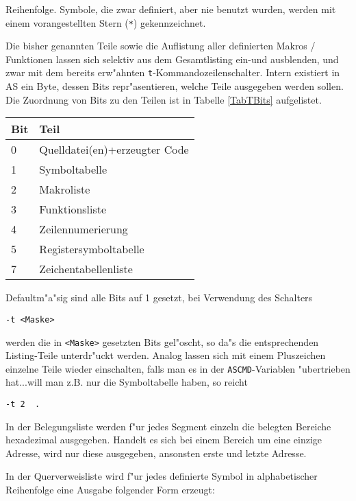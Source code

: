 \documentclass[12pt,a4paper,twoside]{report}
\newcommand{\tty}[1]{{\tt #1}}
\begin{document}
Reihenfolge.  Symbole, die zwar definiert, aber nie benutzt wurden,
werden mit einem vorangestellten Stern (\verb!*!) gekennzeichnet.
\par
Die bisher genannten Teile sowie die Auflistung aller definierten
Makros / Funktionen lassen sich selektiv aus dem Gesamtlisting ein-und
ausblenden, und zwar mit dem bereits erw"ahnten \tty{t}-Kommandozeilenschalter.
Intern existiert in AS ein Byte, dessen Bits repr"asentieren, welche Teile
ausgegeben werden sollen.  Die Zuordnung von Bits zu den Teilen ist in
Tabelle \ref{TabTBits} aufgelistet.
\par
\begin{table*}[p]
\begin{center}\begin{tabular}{|l|l|}
\hline
Bit & Teil \\
\hline
\hline
0   & Quelldatei(en)+erzeugter Code \\
1   & Symboltabelle \\
2   & Makroliste \\
3   & Funktionsliste \\
4   & Zeilennumerierung \\
5   & Registersymboltabelle \\
7   & Zeichentabellenliste \\
\hline
\end{tabular}\end{center}
\caption{Zuordnung der Bits zu den Listingkomponenten\label{TabTBits}}
\end{table*}
Defaultm"a"sig sind alle Bits auf 1 gesetzt, bei Verwendung des Schalters
\begin{verbatim}
-t <Maske>
\end{verbatim}
werden die in \verb!<Maske>! gesetzten Bits gel"oscht, so da"s die entsprechenden
Listing-Teile unterdr"uckt werden.  Analog lassen sich mit einem Pluszeichen
einzelne Teile wieder einschalten, falls man es in der \tty{ASCMD}-Variablen
"ubertrieben hat...will man z.B. nur die Symboltabelle haben, so reicht
\begin{verbatim}
-t 2  .
\end{verbatim}
In der Belegungsliste werden f"ur jedes Segment einzeln die belegten Bereiche
hexadezimal ausgegeben.  Handelt es sich bei einem Bereich um eine einzige
Adresse, wird nur diese ausgegeben, ansonsten erste und letzte Adresse.
\par
In der Querverweisliste wird f"ur jedes definierte Symbol in alphabetischer
Reihenfolge eine Ausgabe folgender Form erzeugt:
\end{document}
